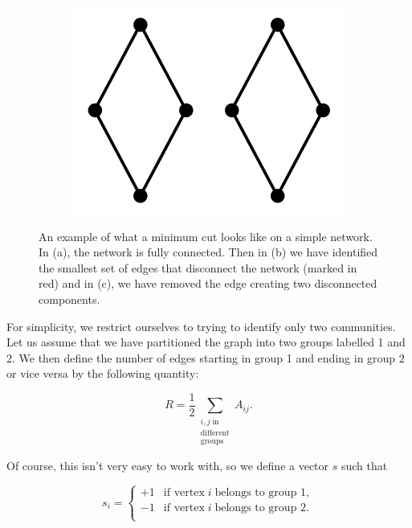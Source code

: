 \begin{figure}[H]
\begin{center}
\begin{subfigure}[b]{0.3\textwidth}
            \includegraphics[width=\textwidth]{img/3/3}
            \caption{}
            \label{}
        \end{subfigure}
    \end{center}
    \caption{An example of what a minimum cut looks like on a simple network. In (a), the network is fully connected. Then in (b) we have identified the smallest set of edges that disconnect the network (marked in red) and in (c), we have removed the edge creating two disconnected components.}
    \label{fig:spectral_cut}
\end{figure}

\newpage
For simplicity, we restrict ourselves to trying to identify only two communities. Let us assume that we have partitioned the graph into two groups labelled 1 and 2. We then define the number of edges starting in group 1 and ending in group 2 or vice versa by the following quantity:

$$ R = \frac{1}{2} \sum_{\substack{i, j \; \text{in} \\ \text{different} \\ \text{groups}}} A_{ij}. $$

\noindent
Of course, this isn't very easy to work with, so we define a vector $s$ such that

$$ s_i = 
\begin{cases}
    +1 & \text{if vertex} \; i \; \text{belongs to group 1}, \\
    -1 & \text{if vertex} \; i \; \text{belongs to group 2}. \\
\end{cases}
$$

